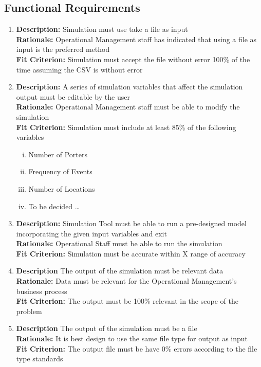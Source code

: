 \documentclass[paper=letter, fontsize=10pt]{scrartcl}
\numberwithin{equation}{section}		%
\numberwithin{figure}{section}			%
\numberwithin{table}{section}				%
\begin{document}
\subsection{Functional Requirements}
\begin{enumerate}
	\item \textbf{Description:} Simulation must use take a file as input
	\\ \textbf{Rationale:} Operational Management staff has indicated that using a file as input is the preferred method 
	\\ \textbf{Fit Criterion:} Simulation must accept the file without error 100\% of the time assuming the CSV is without error
	\item \textbf{Description:} A series of simulation variables that affect the simulation output must be editable by the user
	\\ \textbf{Rationale:} Operational Management staff must be able to modify the simulation
	\\ \textbf{Fit Criterion:} Simulation must include at least 85\% of the following variables   
	\begin{enumerate}[(i)]
		\item Number of Porters
		\item Frequency of Events
		\item Number of Locations
		\item To be decided \ldots
	\end{enumerate}
	\item \textbf{Description:} Simulation Tool must be able to run a pre-designed model incorporating the given input variables and exit
	\\ \textbf{Rationale:} Operational Staff must be able to run the simulation
	\\ \textbf{Fit Criterion:} Simulation must be accurate within X range of accuracy
	\item \textbf{Description} The output of the simulation must be relevant data
	\\ \textbf{Rationale:} Data must be relevant for the Operational Management's business process
	\\ \textbf{Fit Criterion:} The output must be 100\% relevant in the scope of the problem
	\item \textbf{Description} The output of the simulation must be a file
	\\ \textbf{Rationale:} It is best design to use the same file type for output as input
	\\ \textbf{Fit Criterion:} The output file must be have 0\% errors according to the file type standards 
\end{enumerate}
\end{document}
